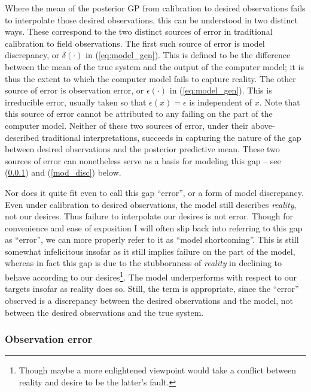 \documentclass{article}
\begin{document}
Where the mean of the posterior GP from calibration to desired observations fails to interpolate those desired observations, this can be understood in two distinct ways. These correspond to the two distinct sources of error in traditional calibration to field observations. The first such source of error is model discrepancy, or $\delta(\cdot)$ in (\ref{eq:model_gen}). This is defined to be the difference between the mean of the true system and the output of the computer model; it is thus the extent to which the computer model fails to capture reality. The other source of error is observation error, or $\epsilon(\cdot)$ in (\ref{eq:model_gen}). This is irreducible error, usually taken so that $\epsilon(x) = \epsilon$ is independent of $x$. Note that this source of error cannot be attributed to any failing on the part of the computer model. Neither of these two sources of error, under their above-described traditional interpretations, succeeds in capturing the nature of the gap between desired observations and the posterior predictive mean. These two sources of error can nonetheless serve as a basis for modeling this gap -- see (\ref{obs_error}) and (\ref{mod_disc}) below.

Nor does it quite fit even to call this gap ``error'', or a form of model discrepancy. Even under calibration to desired observations, the model still describes \emph{reality}, not our desires. Thus failure to interpolate our desires is not error. Though for convenience and ease of exposition I will often slip back into referring to this gap as ``error'', we can more properly refer to it as ``model shortcoming''. This is still somewhat infelicitous insofar as it still implies failure on the part of the model, whereas in fact this gap is due to the stubbornness of \emph{reality} in declining to behave according to our desires\footnote{Though maybe a more enlightened viewpoint would take a conflict between reality and desire to be the latter's fault.}. The model underperforms with respect to our targets insofar as reality does so. Still, the term is appropriate, since the ``error'' observed is a discrepancy between the desired observations and the model, not between the desired observations and the true system.

\subsubsection{Observation error}\label{obs_error}

\end{document}
